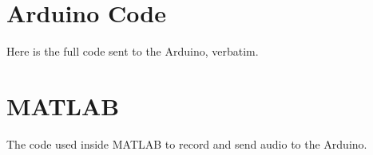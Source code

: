 
\begin{subappendices}
    \renewcommand{\thesection}{\Alph{section}}
    \def\sectionautorefname{Appendix}

    \section{Arduino Code}
    \label{sec:arduinocode}
    Here is the full code sent to the Arduino, verbatim.

    

    \newpage
    \section{MATLAB}
    \label{sec:matlabcode}
    The code used inside MATLAB to record and send audio to the Arduino.

    
\end{subappendices}